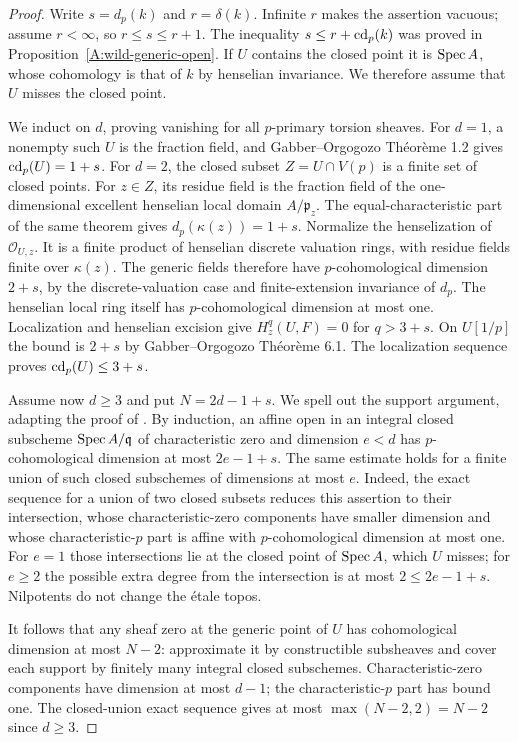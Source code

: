 \begin{proof}
Write $s=d_p(k)$ and $r=\delta(k)$. Infinite $r$ makes the assertion
vacuous; assume $r<\infty$, so $r\leq s\leq r+1$.
The inequality $s\leq r+\operatorname{cd}_p(k)$ was proved in
Proposition~\ref{A:wild-generic-open}.
If $U$ contains the closed point it is $\operatorname{Spec} A$, whose cohomology is
that of $k$ by henselian invariance. We therefore assume that $U$
misses the closed point.

We induct on $d$, proving vanishing for all $p$-primary torsion sheaves.
For $d=1$, a nonempty such $U$ is the fraction field, and
Gabber--Orgogozo Th\'eor\`eme 1.2 gives $\operatorname{cd}_p(U)=1+s$.
For $d=2$, the closed subset $Z=U\cap V(p)$ is a finite set of closed
points. For $z\in Z$, its residue field is the fraction field of the
one-dimensional excellent henselian local domain $A/\mathfrak p_z$.
The equal-characteristic part of the same theorem gives
$d_p(\kappa(z))=1+s$.
Normalize the henselization of $\mathcal O_{U,z}$. It is a finite
product of henselian discrete valuation rings, with residue fields
finite over $\kappa(z)$. The generic fields therefore have
$p$-cohomological dimension $2+s$, by the discrete-valuation case and
finite-extension invariance of $d_p$.
The henselian local ring itself has $p$-cohomological dimension at most
one. Localization and henselian excision give
$H^q_z(U,F)=0$ for $q>3+s$. On $U[1/p]$ the bound is $2+s$ by
Gabber--Orgogozo Th\'eor\`eme 6.1. The localization sequence proves
$\operatorname{cd}_p(U)\leq3+s$.

Assume now $d\geq3$ and put $N=2d-1+s$.
We spell out the support argument, adapting the proof of
\citet[Expos\'e X, Th\'eor\`eme 4.1]{A_SGA4}.
By induction, an affine open in an integral closed subscheme
$\operatorname{Spec} A/\mathfrak q$ of characteristic zero and dimension $e<d$
has $p$-cohomological dimension at most $2e-1+s$.
The same estimate holds for a finite union of such closed subschemes
of dimensions at most $e$. Indeed, the exact sequence for a union of
two closed subsets reduces this assertion to their intersection,
whose characteristic-zero components have smaller dimension and
whose characteristic-$p$ part is affine with $p$-cohomological
dimension at most one. For $e=1$ those intersections lie at the closed
point of $\operatorname{Spec} A$, which $U$ misses; for $e\geq2$ the possible extra
degree from the intersection is at most $2\leq2e-1+s$.
Nilpotents do not change the \'etale topos.

It follows that any sheaf zero at the generic point of $U$ has
cohomological dimension at most $N-2$: approximate it by constructible
subsheaves and cover each support by finitely many integral closed
subschemes. Characteristic-zero components have dimension at most
$d-1$; the characteristic-$p$ part has bound one. The closed-union
exact sequence gives at most $\max(N-2,2)=N-2$ since $d\geq3$.


\end{proof}
